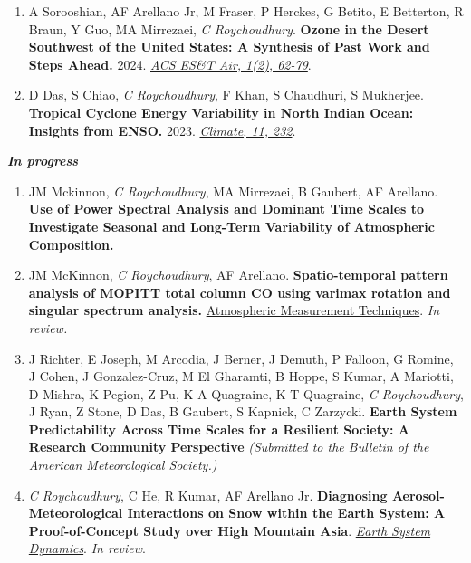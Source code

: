 \documentclass[margin,line]{resume}
\begin{document}
\begin{resume}
\begin{enumerate}[topsep=1pt, partopsep=1pt, itemsep=0.5pt, parsep=0.1pt, leftmargin=15pt,label=\arabic*.]
			\item A Sorooshian, AF Arellano Jr, M Fraser, P Herckes, G Betito, E Betterton, R Braun, Y Guo, MA Mirrezaei, \textit{C Roychoudhury}. \textbf{Ozone in the Desert Southwest of the United States: A Synthesis of Past Work and Steps Ahead.} 2024.  \href{https://doi.org/10.1021/acsestair.3c00033}{\textit{ACS ES\&T Air, 1(2), 62-79}}.
			
			\item D Das, S Chiao, \textit{C Roychoudhury}, F Khan, S Chaudhuri, S Mukherjee. \textbf{Tropical Cyclone Energy Variability in North Indian Ocean: Insights from ENSO.} 2023.
			\href{https://www.mdpi.com/2225-1154/11/12/232}{\textit{Climate, 11, 232}}.
			
		\end{enumerate}
	
		\textbf{\emph{\textcolor{sep}{\textbf{In progress}}}}
			\begin{enumerate}[topsep=1pt, partopsep=1pt, itemsep=0.5pt, parsep=0.1pt, leftmargin=15pt,label=\arabic*.]
				
			\item JM Mckinnon, \textit{C Roychoudhury}, MA Mirrezaei, B Gaubert, AF Arellano.  \textbf{Use of Power Spectral Analysis and Dominant Time Scales to
			Investigate Seasonal and Long-Term Variability of Atmospheric
			Composition.} 
				
			\item JM McKinnon, \textit{C Roychoudhury}, AF Arellano. \textbf{Spatio-temporal pattern analysis of MOPITT total column CO using varimax rotation and singular spectrum analysis.} \href{https://egusphere.copernicus.org/preprints/2025/egusphere-2024-3440}{Atmospheric Measurement Techniques}. \textit{In review.}
			
			\item J Richter, E Joseph, M Arcodia, J Berner, J Demuth, P Falloon, G Romine, J Cohen, J Gonzalez-Cruz, M El Gharamti, B Hoppe, S Kumar, A Mariotti, D Mishra, K Pegion, Z Pu, K A Quagraine, K T Quagraine, \textit{C Roychoudhury}, J Ryan, Z Stone, D Das, B Gaubert, S Kapnick, C Zarzycki.
			 \textbf{Earth System Predictability Across Time Scales for a Resilient Society: A Research Community Perspective} \textit{(Submitted to the Bulletin of the American Meteorological Society.)}
			
			\item \textit{C Roychoudhury}, C He, R Kumar, AF Arellano Jr. \textbf{Diagnosing Aerosol-Meteorological Interactions on Snow within the Earth System: A Proof-of-Concept Study over High Mountain Asia}.  \emph{\href{https://doi.org/10.5194/egusphere-2024-2298}{Earth System Dynamics}}. \textit{In review}.
				

\end{enumerate}
\end{resume}
\end{document}
